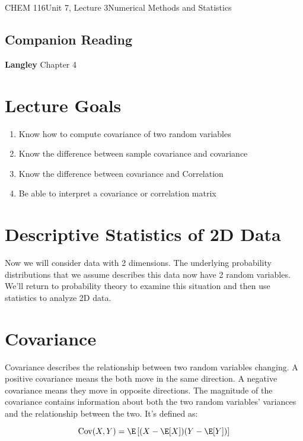 \documentclass{article}
\DeclareMathOperator{\Cov}{Cov}
\begin{document}
\begin{tdoc}{CHEM 116}{Unit 7, Lecture 3}{Numerical Methods and Statistics}

  \subsection*{Companion Reading}
  \textbf{Langley} Chapter 4


  \section{Lecture Goals}

  \begin{enumerate}
  \item Know how to compute covariance of two random variables
  \item Know the difference between sample covariance and covariance
  \item Know the difference between covariance and Correlation
  \item Be able to interpret a covariance or correlation matrix

  \end{enumerate}




\section{Descriptive Statistics of 2D Data}

Now we will consider data with 2 dimensions. The underlying probability distributions that we assume describes this data now have 2 random variables. We'll return to probability theory to examine this situation and then use statistics to analyze 2D data.

\section{Covariance}
Covariance describes the relationship between two random variables
changing. A positive covariance means the both move in the same
direction. A negative covariance means they move in opposite
directions. The magnitude of the covariance contains information about
both the two random variables' variances and the relationship between
the two. It's defined as:

\begin{equation}
  \Cov(X,Y) = \E\left[(X - \E[X])(Y - \E[Y])\right]
\end{equation}


\end{tdoc}
\end{document}
